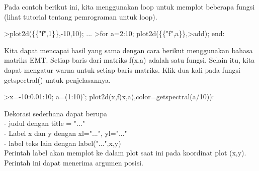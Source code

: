 \documentclass[12pt,Times new roman,letterpaper]{book}
\begin{document}
\begin{eulernootebook}
\begin{eulercomment}
\begin{eulercomment}
\begin{eulernootebook}
\begin{eulercomment}
\begin{eulercomment}
\begin{eulercomment}
\begin{eulercomment}
\begin{eulercomment}
\begin{eulercomment}
\begin{eulercomment}
\begin{eulernotebook}
\begin{eulercomment}
\begin{eulercomment}
\begin{eulercomment}
\begin{eulercomment}
\begin{eulercomment}
Pada contoh berikut ini, kita menggunakan loop untuk memplot beberapa
fungsi (lihat tutorial tentang pemrograman untuk loop).
\end{eulercomment}
\begin{eulerprompt}
>plot2d(\{\{"f",1\}\},-10,10); ...
>for a=2:10; plot2d(\{\{"f",a\}\},>add); end:
\end{eulerprompt}
\begin{eulercomment}
Kita dapat mencapai hasil yang sama dengan cara berikut menggunakan
bahasa matriks EMT. Setiap baris dari matriks f(x,a) adalah satu
fungsi. Selain itu, kita dapat mengatur warna untuk setiap baris
matriks. Klik dua kali pada fungsi getspectral() untuk penjelasannya.
\end{eulercomment}
\begin{eulerprompt}
>x=-10:0.01:10; a=(1:10)'; plot2d(x,f(x,a),color=getspectral(a/10)):
\end{eulerprompt}
\begin{eulercomment}
Dekorasi sederhana dapat berupa\\
- judul dengan title = "..."\\
- Label x dan y dengan xl="...", yl="..."\\
- label teks lain dengan label("...",x,y)\\
Perintah label akan memplot ke dalam plot saat ini pada koordinat plot
(x,y). Perintah ini dapat menerima argumen posisi.


\end{eulercomment}
\end{eulercomment}
\end{eulercomment}
\end{eulercomment}
\end{eulercomment}
\end{eulernotebook}
\end{eulercomment}
\end{eulercomment}
\end{eulercomment}
\end{eulercomment}
\end{eulercomment}
\end{eulercomment}
\end{eulercomment}
\end{eulernootebook}
\end{eulercomment}
\end{eulercomment}
\end{eulernootebook}
\end{document}
